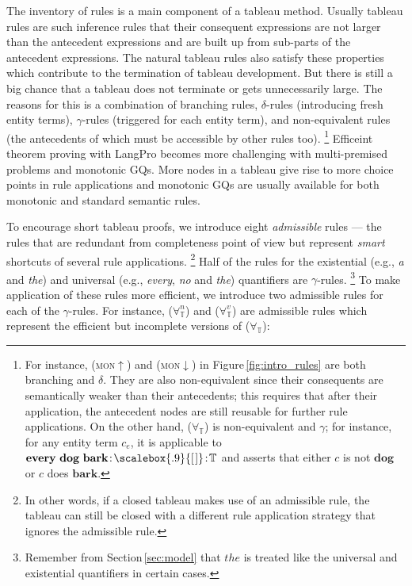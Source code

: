 \documentclass[11pt]{article}
\newcommand{\elist}{\scalebox{.9}{[\kern1pt]}}
\newcommand{\rulen}[1]{{\normalfont\textsc{#1}}}
\newcommand{\synt}[1]{\textbf{#1}}
\newcommand{\T}{\mathbb{T}}
\newcommand{\Co}{\!:\!}
\begin{document}
The inventory of rules is a main component of a tableau method.
Usually tableau rules are such inference rules that their consequent expressions are not larger than the antecedent expressions and are built up from sub-parts of the antecedent expressions.
The natural tableau rules also satisfy these properties which contribute to the termination of tableau development.
But there is still a big chance that a tableau does not terminate or gets unnecessarily large.
The reasons for this is a combination of branching rules, $\delta$-rules (introducing fresh entity terms), $\gamma$-rules (triggered for each entity term), and non-equivalent rules (the antecedents of which must be accessible by other rules too).%
%
\footnote{For instance, (\rulen{mon}$\uparrow$) and (\rulen{mon}$\downarrow$) in Figure\,\ref{fig:intro_rules} are both branching and $\delta$.
They are also non-equivalent since their consequents are semantically weaker than their antecedents;
this requires that after their application, the antecedent nodes are still reusable for further rule applications. 
On the other hand, ($\forall_\T$) is non-equivalent and $\gamma$;
for instance, for any entity term $c_e$, it is applicable to $\synt{every}~\synt{dog}~\synt{bark}\Co\elist\Co\T$ and asserts that either $c$ is not $\synt{dog}$ or $c$ does $\synt{bark}$.  
}
Efficeint theorem proving with LangPro becomes more challenging with multi-premised problems and monotonic GQs.
More nodes in a tableau give rise to more choice points in rule applications and monotonic GQs are usually available for both monotonic and standard semantic rules.


To encourage short tableau proofs, we introduce eight {\em admissible} rules --- the rules that are redundant from completeness point of view but represent {\em smart} shortcuts of several rule applications.%
%
\footnote{In other words, if a closed tableau makes use of an admissible rule, the tableau can still be closed with a different rule application strategy that ignores the admissible rule.
}  
Half of the rules for the existential (e.g., {\em a} and {\em the}) and universal (e.g., {\em every}, {\em no} and {\em the}) quantifiers are $\gamma$-rules.%
%
\footnote{Remember from Section\,\ref{sec:model} that $the$ is treated like the universal and existential quantifiers in certain cases. 
}
To make application of these rules more efficient, we introduce two admissible rules for each of the $\gamma$-rules. 
For instance, ($\forall^{n}_\T$) and ($\forall^{v}_\T$) are admissible rules which represent the efficient but incomplete versions of ($\forall_\T$): 
\end{document}
